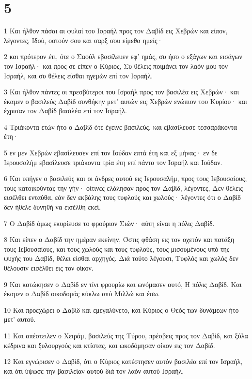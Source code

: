 \chapter{5}

\par 1 Και ήλθον πάσαι αι φυλαί του Ισραήλ προς τον Δαβίδ εις Χεβρών και είπον, λέγοντες, Ιδού, οστούν σου και σαρξ σου είμεθα ημείς·
\par 2 και πρότερον έτι, ότε ο Σαούλ εβασίλευεν εφ' ημάς, συ ήσο ο εξάγων και εισάγων τον Ισραήλ· και προς σε είπεν ο Κύριος, Συ θέλεις ποιμάνει τον λαόν μου τον Ισραήλ, και συ θέλεις είσθαι ηγεμών επί τον Ισραήλ.
\par 3 Και ήλθον πάντες οι πρεσβύτεροι του Ισραήλ προς τον βασιλέα εις Χεβρών· και έκαμεν ο βασιλεύς Δαβίδ συνθήκην μετ' αυτών εις Χεβρών ενώπιον του Κυρίου· και έχρισαν τον Δαβίδ βασιλέα επί τον Ισραήλ.
\par 4 Τριάκοντα ετών ήτο ο Δαβίδ ότε έγεινε βασιλεύς, και εβασίλευσε τεσσαράκοντα έτη·
\par 5 εν μεν Χεβρών εβασίλευσεν επί τον Ιούδαν επτά έτη και εξ μήνας· εν δε Ιερουσαλήμ εβασίλευσε τριάκοντα τρία έτη επί πάντα τον Ισραήλ και Ιούδαν.
\par 6 Και υπήγεν ο βασιλεύς και οι άνδρες αυτού εις Ιερουσαλήμ, προς τους Ιεβουσαίους, τους κατοικούντας την γήν· οίτινες ελάλησαν προς τον Δαβίδ, λέγοντες, Δεν θέλεις εισέλθει ενταύθα, εάν δεν εκβάλης τους τυφλούς και χωλούς· λέγοντες ότι ο Δαβίδ δεν ήθελε δυνηθή να εισέλθη εκεί.
\par 7 Ο Δαβίδ όμως εκυρίευσε το φρούριον Σιών· αύτη είναι η πόλις Δαβίδ.
\par 8 Και είπεν ο Δαβίδ την ημέραν εκείνην, Όστις φθάση εις τον οχετόν και πατάξη τους Ιεβουσαίους, και τους χωλούς και τους τυφλούς, τους μισουμένους υπό της ψυχής του Δαβίδ, θέλει είσθαι αρχηγός. Διά τούτο λέγουσι, Τυφλός και χωλός δεν θέλουσιν εισέλθει εις τον οίκον.
\par 9 Και κατώκησεν ο Δαβίδ εν τίνι φρουρίω και ωνόμασεν αυτό, Η πόλις Δαβίδ. Και έκαμεν ο Δαβίδ οικοδομάς κύκλω από Μιλλώ και έσω.
\par 10 Και προεχώρει ο Δαβίδ και εμεγαλύνετο, και Κύριος ο Θεός των δυνάμεων ήτο μετ' αυτού.
\par 11 Και απέστειλεν ο Χειράμ, βασιλεύς της Τύρου, πρέσβεις προς τον Δαβίδ, και ξύλα κέδρινα και ξυλουργούς και κτίστας, και ωκοδόμησαν οίκον εις τον Δαβίδ.
\par 12 Και εγνώρισεν ο Δαβίδ, ότι ο Κύριος κατέστησεν αυτόν βασιλέα επί τον Ισραήλ, και ότι ύψωσε την βασιλείαν αυτού διά τον λαόν αυτού Ισραήλ.
